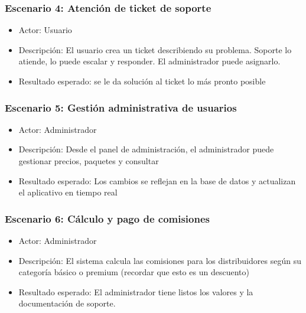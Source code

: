 \subsubsection{Escenario 4: Atención de ticket de soporte}

\begin{itemize}
\item Actor: Usuario

\item Descripción: El usuario crea un ticket describiendo su problema. Soporte lo atiende, lo puede escalar y responder. El administrador puede asignarlo.

\item Resultado esperado: se le da solución al ticket lo más pronto posible
\end{itemize}



\subsubsection{Escenario 5: Gestión administrativa de usuarios}

\begin{itemize}
\item Actor: Administrador

\item Descripción: Desde el panel de administración, el administrador puede gestionar precios, paquetes y consultar

\item Resultado esperado: Los cambios se reflejan en la base de datos y actualizan el aplicativo en tiempo real
\end{itemize}



\subsubsection{Escenario 6: Cálculo y pago de comisiones}

\begin{itemize}
\item Actor: Administrador

\item Descripción: El sistema calcula las comisiones para los distribuidores según su categoría básico o premium (recordar que esto es un descuento)

\item Resultado esperado: El administrador tiene listos los valores y la documentación de soporte.
\end{itemize}


